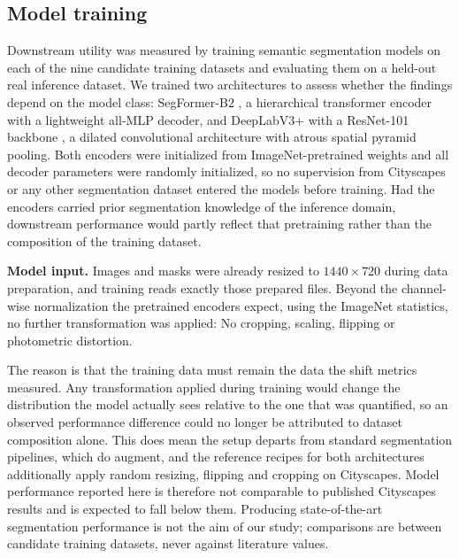 \documentclass[conference]{IEEEtran}
\begin{document}
\subsection{Model training}
Downstream utility was measured by training semantic segmentation models on each of the nine candidate training datasets and evaluating them on a held-out real inference dataset. We trained two architectures to assess whether the findings depend on the model class: SegFormer-B2 \cite{xie2021segformer}, a hierarchical transformer encoder with a lightweight all-MLP decoder, and DeepLabV3+ \cite{chen2018deeplabv3plus} with a ResNet-101 backbone \cite{he2016resnet}, a dilated convolutional architecture with atrous spatial pyramid pooling. Both encoders were initialized from ImageNet-pretrained weights and all decoder parameters were randomly initialized, so no supervision from Cityscapes or any other segmentation dataset entered the models before training. Had the encoders carried prior segmentation knowledge of the inference domain, downstream performance would partly reflect that pretraining rather than the composition of the training dataset.

\textbf{Model input.} Images and masks were already resized to $1440 \times 720$ during data preparation, and training reads exactly those prepared files. Beyond the channel-wise normalization the pretrained encoders expect, using the ImageNet statistics, no further transformation was applied: No cropping, scaling, flipping or photometric distortion.

The reason is that the training data must remain the data the shift metrics measured. Any transformation applied during training would change the distribution the model actually sees relative to the one that was quantified, so an observed performance difference could no longer be attributed to dataset composition alone. This does mean the setup departs from standard segmentation pipelines, which do augment, and the reference recipes for both architectures additionally apply random resizing, flipping and cropping on Cityscapes. Model performance reported here is therefore not comparable to published Cityscapes results and is expected to fall below them. Producing state-of-the-art segmentation performance is not the aim of our study; comparisons are between candidate training datasets, never against literature values.
\end{document}
